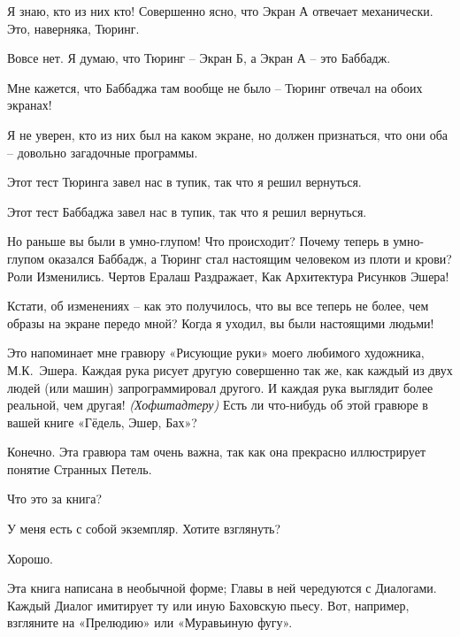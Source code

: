 \documentclass[../main.tex]{subfiles}
\begin{document}
\begin{dialogue}
 Я знаю, кто из них кто! Совершенно ясно, что Экран А отвечает механически. Это, наверняка, Тюринг.

 Вовсе нет. Я думаю, что Тюринг \--- Экран Б, а Экран А \--- это Баббадж.

 Мне кажется, что Баббаджа там вообще не было \--- Тюринг отвечал на обоих экранах!

 Я не уверен, кто из них был на каком экране, но должен признаться, что они оба \--- довольно загадочные программы.


 Этот тест Тюринга завел нас в тупик, так что я решил вернуться.

 Этот тест Баббаджа завел нас в тупик, так что я решил вернуться.

 Но раньше вы были в умно-глупом! Что происходит? Почему теперь в умно-глупом оказался Баббадж, а Тюринг стал настоящим человеком из плоти и крови? Роли Изменились. Чертов Ералаш Раздражает, Как Архитектура Рисунков Эшера!

 Кстати, об изменениях \--- как это получилось, что вы все теперь не более, чем образы на экране передо мной? Когда я уходил, вы были настоящими людьми!

 Это напоминает мне гравюру «Рисующие руки» моего любимого художника, М.К.~Эшера. Каждая рука рисует другую совершенно так же, как каждый из двух людей (или машин) запрограммировал другого. И каждая рука выглядит более реальной, чем другая! \emph{(Хофштадтеру)} Есть ли что-нибудь об этой гравюре в вашей книге «Гёдель, Эшер, Бах»?

 Конечно. Эта гравюра там очень важна, так как она прекрасно иллюстрирует понятие Странных Петель.

 Что это за книга?

 У меня есть с собой экземпляр. Хотите взглянуть?

 Хорошо.


 Эта книга написана в необычной форме; Главы в ней чередуются с Диалогами. Каждый Диалог имитирует ту или иную Баховскую пьесу. Вот, например, взгляните на «Прелюдию» или «Муравьиную фугу».


\end{dialogue}
\end{document}
